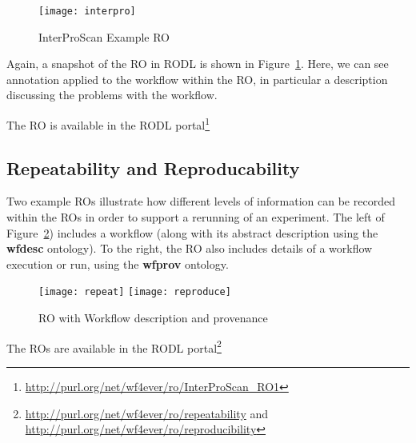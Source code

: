 \begin{figure}[ht]
  \centering
  \texttt{[image: interpro]}
  \caption{InterProScan Example RO}
  \label{fig:interpro}
\end{figure}

Again, a snapshot of the RO in RODL is shown in
Figure~\ref{fig:interpro}. Here, we can see annotation applied to the
workflow within the RO, in particular a description discussing the
problems with the workflow. 

The RO is available in the RODL portal\footnote{\url{http://purl.org/net/wf4ever/ro/InterProScan_RO1}}

\subsection{Repeatability and Reproducability}

Two example ROs illustrate how different levels of information can be
recorded within the ROs in order to support a rerunning of an
experiment. The left of Figure~\ref{fig:repeat}) includes a workflow
(along with its abstract description using the \textbf{wfdesc}
ontology). To the right, the RO also includes details of a workflow
execution or run, using the \textbf{wfprov} ontology.

\begin{figure}[ht]
  \centering
  \texttt{[image: repeat]}
  \texttt{[image: reproduce]}
  \caption{RO with Workflow description and provenance}
  \label{fig:repeat}
\end{figure}

The ROs are available in the RODL
portal\footnote{\url{http://purl.org/net/wf4ever/ro/repeatability} and
  \url{http://purl.org/net/wf4ever/ro/reproducibility}}
